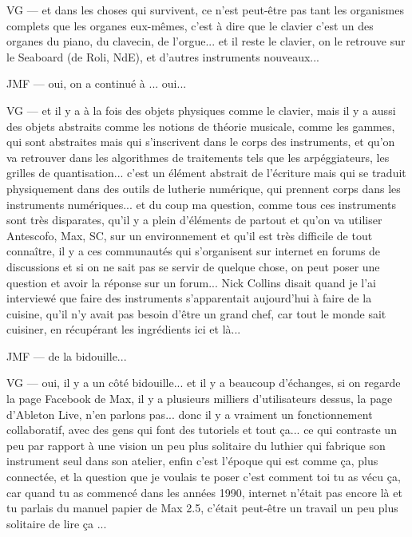 VG — et dans les choses qui survivent, ce n'est peut-être pas tant les organismes complets que les organes eux-mêmes, c'est à dire que le clavier c'est un des organes du piano, du clavecin, de l'orgue... et il reste le clavier, on le retrouve sur le Seaboard (de Roli, NdE), et d'autres instruments nouveaux... 

JMF — oui, on a continué à ... oui... 

VG — et il y a à la fois des objets physiques comme le clavier, mais il y a aussi des objets abstraits comme les notions de théorie musicale, comme les gammes, qui sont abstraites mais qui s'inscrivent dans le corps des instruments, et qu'on va retrouver dans les algorithmes de traitements tels que les arpéggiateurs, les grilles de quantisation... c'est un élément abstrait de l'écriture mais qui se traduit physiquement dans des outils de lutherie numérique, qui prennent corps dans les instruments numériques... et du coup ma question, comme tous ces instruments sont très disparates, qu'il y a plein d'éléments de partout et qu'on va utiliser Antescofo, Max, SC, sur un environnement et qu'il est très difficile de tout connaître, il y a ces communautés qui s'organisent sur internet en forums de discussions et si on ne sait pas se servir de quelque chose, on peut poser une question et avoir la réponse sur un forum... Nick Collins disait quand je l'ai interviewé que faire des instruments s'apparentait aujourd'hui à faire de la cuisine, qu'il n'y avait pas besoin d'être un grand chef, car tout le monde sait cuisiner, en récupérant les ingrédients ici et là... 

JMF — de la bidouille... 

VG — oui, il y a un côté bidouille... et il y a beaucoup d'échanges, si on regarde la page Facebook de Max, il y a plusieurs milliers d'utilisateurs dessus, la page d'Ableton Live, n'en parlons pas... donc il y a vraiment un fonctionnement collaboratif, avec des gens qui font des tutoriels et tout ça... ce qui contraste un peu par rapport à une vision un peu plus solitaire du luthier qui fabrique son instrument seul dans son atelier, enfin c'est l'époque qui est comme ça, plus connectée, et la question que je voulais te poser c'est comment toi tu as vécu ça, car quand tu as commencé dans les années 1990, internet n'était pas encore là et tu parlais du manuel papier de Max 2.5, c'était peut-être un travail un peu plus solitaire de lire ça ... 

